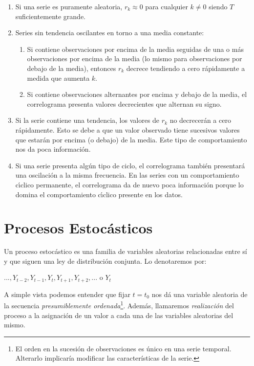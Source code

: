 \documentclass[a4paper,10pt]{article}
\begin{document}
\begin{enumerate}
 \item Si una serie es puramente aleatoria, $r_k \approx 0$ para cualquier $k \neq 0$ siendo $T$ suficientemente grande.

 \item Series sin tendencia oscilantes en torno a una media constante:

 \begin{enumerate}
  \item Si contiene observaciones por encima de la media seguidas de una o más observaciones por encima de la media (lo mismo para observaciones por debajo de la media), entonces $r_k$ decrece tendiendo a cero rápidamente a medida que aumenta $k$.

  \item Si contiene observaciones alternantes por encima y debajo de la media, el correlograma presenta valores decrecientes que alternan su signo.
 \end{enumerate}

  \item Si la serie contiene una tendencia, los valores de $r_k$ no decrecerán a cero rápidamente. Esto se debe a que un valor observado tiene sucesivos valores que estarán por encima (o debajo) de la media. Este tipo de comportamiento nos da poca información.

  \item Si una serie presenta algún tipo de ciclo, el correlograma también presentará una oscilación a la misma frecuencia. En las series con un comportamiento cı́clico permanente, el correlograma da de nuevo poca información porque lo domina el comportamiento cı́clico presente en los datos.
\end{enumerate}





\section{Procesos Estocásticos}

Un proceso estocástico es una familia de variables aleatorias relacionadas entre sí y que siguen una ley de distribución conjunta. Lo denotaremos por:

\begin{center}
 $...,Y_{t-2},Y_{t-1},Y_t,Y_{t+1},Y_{t+2},...$ o $Y_t$
\end{center}

A simple vista podemos entender que fijar $t=t_0$ nos dá una variable aleatoria de la secuencia \textit{presumiblemente ordenada}\footnote{El orden en la sucesión de observaciones es único en una serie temporal. Alterarlo implicaría modificar las características de la serie.}. Además, llamaremos \textit{realización} del proceso a la asignación de un valor a cada una de las variables aleatorias del mismo.
\end{document}
